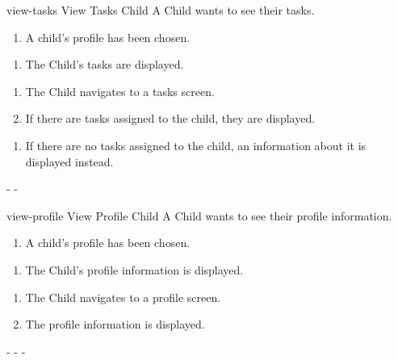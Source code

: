 {view-tasks}
{View Tasks}
{Child}
{A Child wants to see their tasks.}
{\begin{enumerate} %
    \item A child's profile has been chosen.
\end{enumerate}}
{\begin{enumerate} %
    \item The Child's tasks are displayed.
\end{enumerate}}
{\begin{enumerate} %
    \item The Child navigates to a tasks screen.
    \item If there are tasks assigned to the child, they are displayed.
\end{enumerate}}
{\begin{enumerate} %
[label=2.\alph*.]
    \item If there are no tasks assigned to the child, an information about it is displayed instead.
\end{enumerate}}
{-} %
{-} %


{view-profile}
{View Profile}
{Child}
{A Child wants to see their profile information.}
{\begin{enumerate} %
    \item A child's profile has been chosen.
\end{enumerate}}
{\begin{enumerate} %
    \item The Child's profile information is displayed.
\end{enumerate}}
{\begin{enumerate} %
    \item The Child navigates to a profile screen.
    \item The profile information is displayed.
\end{enumerate}}
{-} %
{-} %
{-} %


